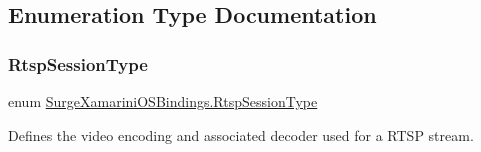 \subsection{Enumeration Type Documentation}
\mbox{\label{namespace_surge_xamarini_o_s_bindings_ae265f95a36d7f788d0c279a0cd2da6c1}} 
\subsubsection{\texorpdfstring{Rtsp\+Session\+Type}{RtspSessionType}}
{\footnotesize\ttfamily enum \hyperlink{namespace_surge_xamarini_o_s_bindings_ae265f95a36d7f788d0c279a0cd2da6c1}{Surge\+Xamarini\+O\+S\+Bindings.\+Rtsp\+Session\+Type}\hspace{0.3cm}{\ttfamily [strong]}}



Defines the video encoding and associated decoder used for a R\+T\+SP stream. 

